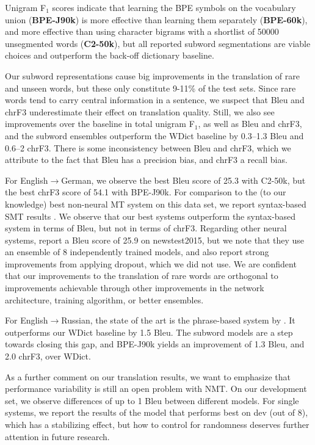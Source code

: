 Unigram F$_1$ scores indicate that learning the BPE symbols on the vocabulary union (\textbf{BPE-J90k})
is more effective than learning them separately (\textbf{BPE-60k}), and more effective than using character bigrams with a shortlist of \num{50000} unsegmented words (\textbf{C2-50k}),
but all reported subword segmentations are viable choices and outperform the back-off dictionary baseline.

Our subword representations cause big improvements in the translation of rare and unseen words, but these only constitute 9-11\% of the test sets. Since rare words tend to carry central information in a sentence, we suspect that {\sc Bleu} and {\sc chrF3} underestimate their effect on translation quality. Still, we also see improvements over the baseline in total unigram F$_1$, as well as {\sc Bleu} and {\sc chrF3}, and the subword ensembles outperform the WDict baseline by 0.3--1.3 {\sc Bleu} and 0.6--2 {\sc chrF3}. There is some inconsistency between {\sc Bleu} and {\sc chrF3}, which we attribute to the fact that {\sc Bleu} has a precision bias, and {\sc chrF3} a recall bias.

For English$\to$German, we observe the best {\sc Bleu} score of 25.3 with C2-50k, but the best {\sc chrF3} score of 54.1 with BPE-J90k. For comparison to the (to our knowledge) best non-neural MT system on this data set, we report syntax-based SMT results \cite{sennrichhaddow15}. We observe that our best systems outperform the syntax-based system in terms of {\sc Bleu}, but not in terms of {\sc chrF3}. Regarding other neural systems,  report a {\sc Bleu} score of 25.9 on newstest2015, but we note that they use an ensemble of 8 independently trained models, and also report strong improvements from applying dropout, which we did not use. We are confident that our improvements to the translation of rare words are orthogonal to improvements achievable through other improvements in the network architecture, training algorithm, or better ensembles.

For English$\to$Russian, the state of the art is the phrase-based system by .
It outperforms our WDict baseline by 1.5 {\sc Bleu}. The subword models are a step towards closing this gap, and BPE-J90k yields an improvement of 1.3 {\sc Bleu}, and 2.0 {\sc chrF3}, over WDict.

As a further comment on our translation results, we want to emphasize that performance variability is still an open problem with NMT. On our development set, we observe differences of up to 1 {\sc Bleu} between different models. For single systems, we report the results of the model that performs best on dev (out of 8), which has a stabilizing effect, but how to control for randomness deserves further attention in future research.

